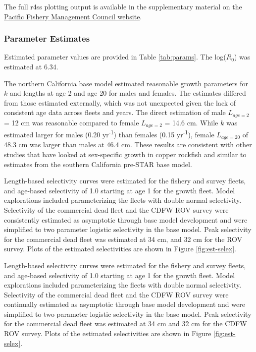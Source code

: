 \documentclass[11pt,
  english,
  letterpaper,
]{article}
\begin{document}
The full r4ss plotting output is available in the supplementary material on the \href{pcouncil.org}{Pacific Fishery Management Council website}.

\hypertarget{parameter-estimates}{%
\subsubsection{Parameter Estimates}\label{parameter-estimates}}

Estimated parameter values are provided in Table \ref{tab:params}. The log(\(R_0\)) was estimated at 6.34.

The northern California base model estimated reasonable growth parameters for \(k\) and lengths at age 2 and age 20 for males and females. The estimates differed from those estimated externally, which was not unexpected given the lack of consistent age data across fleets and years. The direct estimation of male \(L_{age=2}\) = 12 cm was reasonable compared to female \(L_{age=2}\) = 14.6 cm. While \(k\) was estimated larger for males (0.20 yr\textsuperscript{-1}) than females (0.15 yr\textsuperscript{-1}), female \(L_{age=20}\) of 48.3 cm was larger than males at 46.4 cm. These results are consistent with other studies that have looked at sex-specific growth in copper rockfish and similar to estimates from the southern California pre-STAR base model.

Length-based selectivity curves were estimated for the fishery and survey fleets, and age-based selectivity of 1.0 starting at age 1 for the growth fleet. Model explorations included parameterizing the fleets with double normal selectivity. Selectivity of the commercial dead fleet and the CDFW ROV survey were consistently estimated as asymptotic through base model development and were simplified to two parameter logistic selectivity in the base model. Peak selectivity for the commercial dead fleet was estimated at 34 cm, and 32 cm for the ROV survey. Plots of the estimated selectivities are shown in Figure \ref{fig:est-selex}.

Length-based selectivity curves were estimated for the fishery and survey fleets, and age-based selectivity of 1.0 starting at age 1 for the growth fleet. Model explorations included parameterizing the fleets with double normal selectivity. Selectivity of the commercial dead fleet and the CDFW ROV survey were continually estimated as asymptotic through base model development and were simplified to two parameter logistic selectivity in the base model. Peak selectivity for the commercial dead fleet was estimated at 34 cm and 32 cm for the CDFW ROV survey. Plots of the estimated selectivities are shown in Figure \ref{fig:est-selex}.
\end{document}
